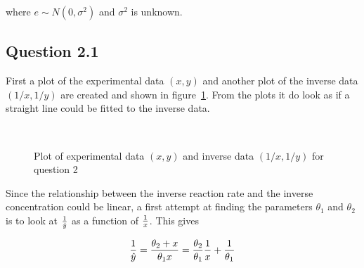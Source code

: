 where $e\sim N(0,\sigma^2)$ and $\sigma^2$ is unknown.

\subsection*{Question 2.1}


First a plot of the experimental data $(x,y)$ and another plot of the inverse data $(1/x, 1/y)$ are created and shown in figure~\ref{fig:ex2-plot-data}. From the plots it do look as if a straight line could be fitted to the inverse data.

\begin{figure}[!ht]
    \centering
    \mbox{ \quad 
          }
    \caption{Plot of experimental data $(x,y)$ and inverse data $(1/x, 1/y)$ for question 2}
    \label{fig:ex2-plot-data}
\end{figure}

Since the relationship between the inverse reaction rate and the inverse concentration could be linear, a first attempt at finding the parameters $\theta_1$ and $\theta_2$ is to look at $\frac{1}{\hat{y}}$ as a function of $\frac{1}{x}$. This gives

\begin{equation*}
    \frac{1}{\hat{y}} = \frac{\theta_2 + x}{\theta_1x} = \frac{\theta_2}{\theta_1}\frac{1}{x} + \frac{1}{\theta_1}
\end{equation*}

